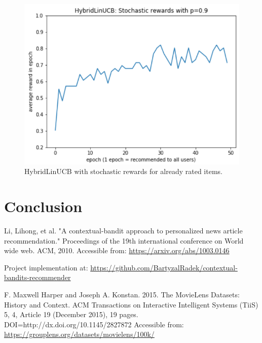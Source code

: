 \documentclass[12pt, titlepage]{article}
\begin{document}
\begin{figure}[h!]
 \centering
 \includegraphics[scale=0.5]{img/HybridLinUCB-stochastic}
 \caption{HybridLinUCB with stochastic rewards for already rated items. }
 \label{fig:HybridlinUCB-stochastic}
\end{figure}


\section{Conclusion}\label{sec:conclusion}


\begin{thebibliography}{0}

   Li, Lihong, et al. "A contextual-bandit approach to personalized news article recommendation." Proceedings of the 19th international conference on World wide web. ACM, 2010. Accessible from: \url{https://arxiv.org/abs/1003.0146}
  
   Project implementation at: \url{https://github.com/BartyzalRadek/contextual-bandits-recommender}
  
   F. Maxwell Harper and Joseph A. Konstan. 2015. The MovieLens Datasets:
History and Context. ACM Transactions on Interactive Intelligent
Systems (TiiS) 5, 4, Article 19 (December 2015), 19 pages.
DOI=http://dx.doi.org/10.1145/2827872 Accessible from: \url{https://grouplens.org/datasets/movielens/100k/}



\end{thebibliography}
\end{document}
